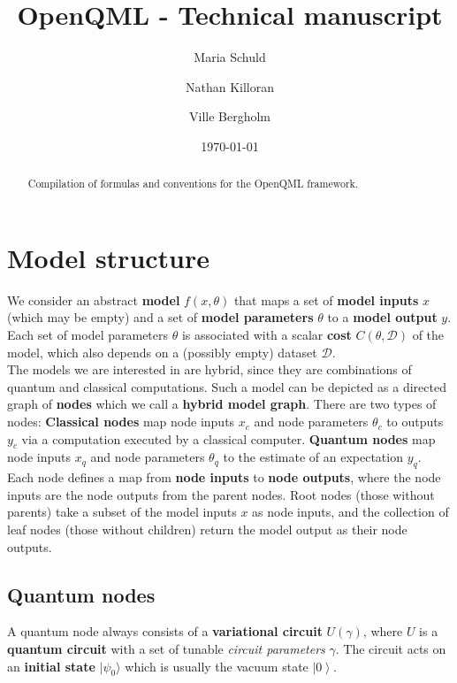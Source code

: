 \documentclass[aps,pra,10pt,twocolumn,groupedaddress,nofootinbib]{revtex4-1}
\theoremstyle{plain}
\newcommand{\ket}[1]{\ensuremath{\left| #1 \right \rangle}}
\begin{document}
\title{OpenQML - Technical manuscript}
\author{Maria Schuld}
\author{Nathan Killoran}
\author{Ville Bergholm}


\date{\today}

\begin{abstract}
Compilation of formulas and conventions for the OpenQML framework.
\end{abstract}

\maketitle


\section{Model structure}

We consider an abstract \textbf{model} $f(x, \theta)$
that maps a set of \textbf{model inputs} $x$ (which may be empty) and a set of \textbf{model parameters} $\theta$ to a \textbf{model output} $y$. \\

Each set of model parameters $\theta$ is associated with a scalar \textbf{cost} $C(\theta, \mathcal{D})$ of the model, which also depends on a (possibly empty) dataset $\mathcal{D}$.\\

The models we are interested in are hybrid, since they are combinations of quantum and classical computations. Such a model can be depicted as a directed graph of \textbf{nodes} which we call a \textbf{hybrid model graph}. There are two types of nodes: \textbf{Classical nodes} map node inputs $x_c$ and node parameters $\theta_c$ to outputs $y_c$ via a computation executed by a classical computer. \textbf{Quantum nodes} map node inputs $x_q$ and node parameters $\theta_q$ to the estimate of an expectation $y_q$.\\

Each node defines a map from \textbf{node inputs} to \textbf{node outputs}, where the node inputs are the node outputs from the parent nodes. Root nodes (those without parents) take a subset of the model inputs $x$ as node inputs, and the collection of leaf nodes (those without children) return the model output as their node outputs.

\subsection{Quantum nodes}
A quantum node always consists of a \textbf{variational circuit} $U(\gamma)$, where $U$ is a \textbf{quantum circuit} with a set of tunable \textit{circuit parameters} $\gamma$. The circuit acts on an \textbf{initial state} $|\psi_0 \rangle$ which is usually the vacuum state $\ket{0}$.\\
\end{document}
